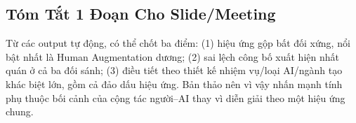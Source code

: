\subsection*{Tóm Tắt 1 Đoạn Cho Slide/Meeting}
Từ các output tự động, có thể chốt ba điểm: (1) hiệu ứng gộp bất đối xứng, nổi bật nhất là Human Augmentation dương; (2) sai lệch công bố xuất hiện nhất quán ở cả ba đối sánh; (3) điều tiết theo thiết kế nhiệm vụ/loại AI/ngành tạo khác biệt lớn, gồm cả đảo dấu hiệu ứng. Bản thảo nên vì vậy nhấn mạnh tính phụ thuộc bối cảnh của cộng tác người--AI thay vì diễn giải theo một hiệu ứng chung.

